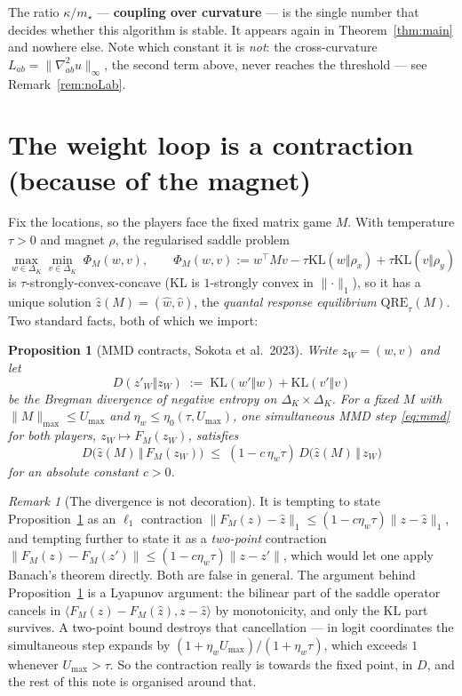 \documentclass[11pt,a4paper]{article}
\theoremstyle{plain}
\newtheorem{proposition}[theorem]{Proposition}
\theoremstyle{definition}
\theoremstyle{remark}
\newtheorem{remark}[theorem]{Remark}
\newcommand{\KL}{\mathrm{KL}}
\newcommand{\QRE}{\mathrm{QRE}}
\newcommand{\simplex}{\Delta}
\newcommand{\ip}[2]{\langle #1, #2\rangle}
\newcommand{\norm}[1]{\lVert #1 \rVert}
\begin{document}
\noindent The ratio $\kappa/m_\star$ --- \textbf{coupling over curvature} --- is the
single number that decides whether this algorithm is stable. It appears again in
Theorem~\ref{thm:main} and nowhere else. Note which constant it is \emph{not}: the
cross-curvature $L_{ab}=\norm{\nabla^2_{ab}u}_\infty$, the second term above, never
reaches the threshold --- see Remark~\ref{rem:noLab}.

\section{The weight loop is a contraction (because of the magnet)}\label{sec:weights}

Fix the locations, so the players face the fixed matrix game $M$. With temperature
$\tau>0$ and magnet $\rho$, the regularised saddle problem
\begin{equation}\label{eq:qre}
\max_{w\in\simplex_K}\min_{v\in\simplex_K}\;
\Phi_M(w,v),\qquad
\Phi_M(w,v):=w^\top M v - \tau\KL(w\Vert\rho_x) + \tau\KL(v\Vert\rho_y)
\end{equation}
is $\tau$-strongly-convex-concave (KL is $1$-strongly convex in $\norm\cdot_1$), so it
has a unique solution $\hat z(M)=(\hat w,\hat v)$, the \emph{quantal response
equilibrium} $\QRE_\tau(M)$. Two standard facts, both of which we import:

\begin{proposition}[MMD contracts, Sokota et al.\ 2023]\label{prop:mmd}
Write $z_W=(w,v)$ and let
\[
D(z'_W\Vert z_W)\;:=\;\KL(w'\Vert w)+\KL(v'\Vert v)
\]
be the Bregman divergence of negative entropy on $\simplex_K\times\simplex_K$. For a
fixed $M$ with $\norm{M}_{\max}\le U_{\max}$ and $\eta_w\le\eta_0(\tau,U_{\max})$, one
simultaneous MMD step \eqref{eq:mmd} for both players, $z_W\mapsto F_M(z_W)$, satisfies
\[
D\big(\hat z(M)\,\big\Vert\,F_M(z_W)\big)\;\le\;(1-c\,\eta_w\tau)\,
D\big(\hat z(M)\,\big\Vert\,z_W\big)
\]
for an absolute constant $c>0$.
\end{proposition}

\begin{remark}[The divergence is not decoration]
It is tempting to state Proposition~\ref{prop:mmd} as an $\ell_1$ contraction
$\norm{F_M(z)-\hat z}_1\le(1-c\eta_w\tau)\norm{z-\hat z}_1$, and tempting further to
state it as a \emph{two-point} contraction $\norm{F_M(z)-F_M(z')}\le(1-c\eta_w\tau)\norm{z-z'}$,
which would let one apply Banach's theorem directly. Both are false in general. The
argument behind Proposition~\ref{prop:mmd} is a Lyapunov argument: the bilinear part of
the saddle operator cancels in $\ip{F_M(z)-F_M(\hat z)}{z-\hat z}$ by monotonicity, and
only the KL part survives. A two-point bound destroys that cancellation --- in logit
coordinates the simultaneous step expands by $(1+\eta_wU_{\max})/(1+\eta_w\tau)$, which
exceeds $1$ whenever $U_{\max}>\tau$. So the contraction really is towards the fixed
point, in $D$, and the rest of this note is organised around that.
\end{remark}
\end{document}
